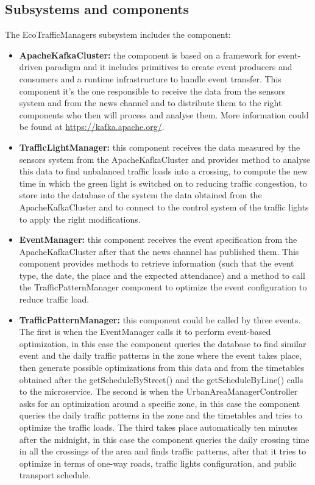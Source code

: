 \documentclass[12pt, a4paper, twoside, openright]{report}
\begin{document}
\subsection{Subsystems and components}

The EcoTrafficManagers subsystem includes the component:


\begin{itemize}
\item
  \textbf{ApacheKafkaCluster:} the component is based on a framework for
  event-driven paradigm and it includes primitives to create event
  producers and consumers and a runtime infrastructure to handle event
  transfer. This component it's the one responsible to receive the data
  from the sensors system and from the news channel and to distribute
  them to the right components who then will process and analyse them.
  More information could be found at \url{https://kafka.apache.org/}.
\item
  \textbf{TrafficLightManager:} this component receives the data
  measured by the sensors system from the ApacheKafkaCluster and
  provides method to analyse this data to find unbalanced traffic loads
  into a crossing, to compute the new time in which the green light is
  switched on to reducing traffic congestion, to store into the database
  of the system the data obtained from the ApacheKafkaCluster and to
  connect to the control system of the traffic lights to apply the right
  modifications.
\item
  \textbf{EventManager:} this component receives the event specification
  from the ApacheKafkaCluster after that the news channel has published
  them. This component provides methods to retrieve information (such
  that the event type, the date, the place and the expected attendance)
  and a method to call the TrafficPatternManager component to optimize
  the event configuration to reduce traffic load.
\item
  \textbf{TrafficPatternManager:} this component could be called by
  three events. The first is when the EventManager calls it to perform
  event-based optimization, in this case the component queries the
  database to find similar event and the daily traffic patterns in the
  zone where the event takes place, then generate possible optimizations
  from this data and from the timetables obtained after the
  getScheduleByStreet() and the getScheduleByLine() calls to the
  microservice. The second is when the UrbanAreaManagerController asks
  for an optimization around a specific zone, in this case the component
  queries the daily traffic patterns in the zone and the timetables and
  tries to optimize the traffic loads. The third takes place
  automatically ten minutes after the midnight, in this case the
  component queries the daily crossing time in all the crossings of the
  area and finds traffic patterns, after that it tries to optimize in
  terms of one-way roads, traffic lights configuration, and public
  transport schedule.
\end{itemize}
\end{document}
